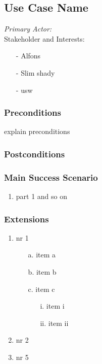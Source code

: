 \documentclass[./detailed_overview_usecases.tex]{subfiles}
\begin{document}
    \subsection{Use Case Name}

    \textit{Primary Actor:}
    \\
    Stakeholder and Interests:
    \begin{itemize}
        \item[-] Alfons
        \item[-] Slim shady
        \item[-] usw
    \end{itemize}

    \subsubsection*{Preconditions}
    explain preconditions

    \subsubsection*{Postconditions}

    \subsubsection*{Main Success Scenario}
    \begin{enumerate}
        \item part 1 and so on
    \end{enumerate}

    \subsubsection*{Extensions}
    \begin{enumerate}
        \item nr 1 \begin{itemize}
                       \item[a.] item a
                       \item[b.] item b
                       \item[c.] item c
                                \begin{itemize}
                                     \item[i.] item i
                                     \item[ii.] item ii
                                \end{itemize}
                    \end{itemize}
        \item nr 2
        \setcounter{enumi}{4}
        \item nr 5
    \end{enumerate}
\end{document}
